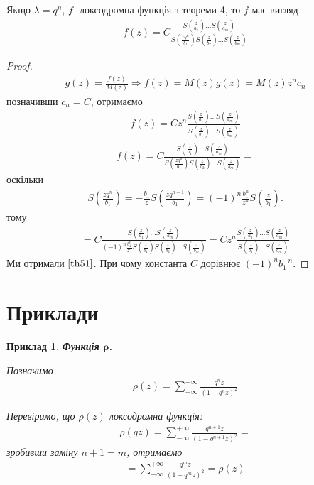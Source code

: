 \documentclass[12pt,a4paper]{article}
\begin{document}
\begin{thm}
Якщо $\lambda =q^{n}$, $f$- локсодромна функція з теореми 4, то  $f$ має вигляд
\begin{equation}\label{th51}
\begin{array}{l}
 f(z)= C\tfrac{S(\frac{z}{a_{1}})...S(\frac{z}{a_{m}})}{S(\frac{zq^{n}}{b_{1}})S(\frac{z}{b_{2}})...S(\frac{z}{b_{m}})}
\end{array}
\end{equation}
 \end{thm}
\begin{proof}
\[\begin{array}{l}
g(z)=\frac{f(z)}{M(z)}\Rightarrow f(z)=M(z)g(z)= M(z)z^{n}c_{n}
 \end{array}\]
 позначивши $c_{n}=C$, отримаємо 
\[\begin{array}{l} 
f(z) =Cz^{n}\frac{S(\frac{z}{a_{1}})...S(\frac{z}{a_{m}})}{S(\frac{z}{b_{1}})...S(\frac{z}{b_{m}})} 
\end{array}\]
\[\begin{array}{l}
f(z)=C\tfrac{S(\frac{z}{a_{1}})...S(\frac{z}{a_{m}})}{S(\frac{zq^{n}}{b_{1}})S(\frac{z}{b_{2}})...S(\frac{z}{b_{m}})}= 
 \end{array}\]
оскільки
\[\begin{array}{l}
S(\frac{zq^{n}}{b_{1}})= -\frac{b_{1}}{z}S(\frac{zq^{n-1}}{b_{1}})=(-1)^{n}\frac{b_{1}^{n}}{z^{n}}S(\frac{z}{b_{1}}).
 \end{array}\]
тому
\[\begin{array}{l}
 =C\tfrac{S(\frac{z}{a_{1}})...S(\frac{z}{a_{m}})}{(-1)^{n}\frac{b_{1}^{n}}{z^{n}} S(\frac{z}{b_{1}})S(\frac{z}{b_{2}})...S(\frac{z}{b_{m}})}=Cz^{n}\frac{S(\frac{z}{a_{1}})...S(\frac{z}{a_{m}})}{S(\frac{z}{b_{1}})...S(\frac{z}{b_{m}})} 
  \end{array}\]
Ми отримали $\eqref{th51}$. При чому константа $C$ дорівнює $(-1)^{n}b_{1}^{-n}$.
\end{proof}


\clearpage
\section{Приклади}

\newtheorem{pryk}{Приклад}
\begin{pryk}
\textit{\textbf{Функція $\mathbf{\rho}$.}}
\begin{ozn}
  Позначимо
  \[\begin{array}{l}
   \rho(z)=\sum\limits^{+\infty}_{-\infty}  \frac{q^{n}z}{(1-q^{n}z)^2}
  \end{array}\]
\end{ozn}
Перевіримо, що $\rho(z)$ локсодромна функція:\\
\[\begin{array}{l}
 \rho(qz)=\sum\limits^{+\infty}_{-\infty}  \frac{q^{n+1}z}{(1-q^{n+1}z)^2}=
\end{array}\]
зробивши заміну $n+1=m$, отримаємо
\[\begin{array}{l}
=\sum\limits^{+\infty}_{-\infty}  \frac{q^{m}z}{(1-q^{m}z)^2}=\rho(z)
\end{array}\]
\end{pryk}
\[\begin{array}{l}
\end{array}\]
\end{document}
